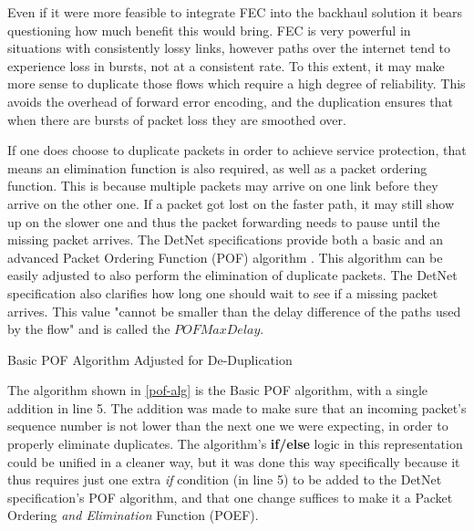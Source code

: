 Even if it were more feasible to integrate FEC into the backhaul solution it bears questioning how much benefit this would bring. FEC is very powerful in situations with consistently lossy links, however paths over the internet tend to experience loss in bursts, not at a consistent rate. To this extent, it may make more sense to duplicate those flows which require a high degree of reliability. This avoids the overhead of forward error encoding, and the duplication ensures that when there are bursts of packet loss they are smoothed over.

If one does choose to duplicate packets in order to achieve service protection, that means an elimination function is also required, as well as a packet ordering function. This is because multiple packets may arrive on one link before they arrive on the other one. If a packet got lost on the faster path, it may still show up on the slower one and thus the packet forwarding needs to pause until the missing packet arrives. The DetNet specifications provide both a basic and an advanced Packet Ordering Function (POF) algorithm \cite{ietf-detnet-pof-08}. This algorithm can be easily adjusted to also perform the elimination of duplicate packets. The DetNet specification also clarifies how long one should wait to see if a missing packet arrives. This value "cannot be smaller than the delay difference of the paths used by the flow" and is called the $POFMaxDelay$.

\begin{algorithm}[H]
\label{pof-alg}


\caption{Basic POF Algorithm Adjusted for De-Duplication}
\end{algorithm}

The algorithm shown in \ref{pof-alg} is the Basic POF algorithm, with a single addition in line 5. The addition was made to make sure that an incoming packet's sequence number is not lower than the next one we were expecting, in order to properly eliminate duplicates. The algorithm's \textbf{if/else} logic in this representation could be unified in a cleaner way, but it was done this way specifically because it thus requires just one extra \textit{if} condition (in line 5) to be added to the DetNet specification's POF algorithm, and that one change suffices to make it a Packet Ordering \textit{and Elimination} Function (POEF).

